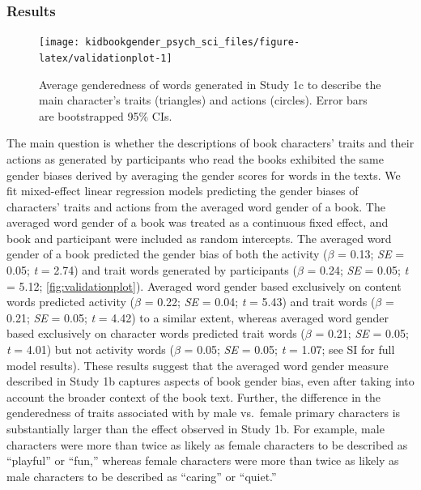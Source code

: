 \documentclass[
  english,
  ,man,floatsintext]{apa6}
\begin{document}
\hypertarget{results-1}{%
\subsubsection{Results}\label{results-1}}

\begin{figure}[t]
\texttt{[image: kidbookgender\_psych\_sci\_files/figure-latex/validationplot-1]} \caption{Average genderedness of words generated in Study 1c to describe the main character's traits (triangles) and actions (circles). Error bars are bootstrapped 95\% CIs.}\label{fig:validationplot}
\end{figure}

The main question is whether the descriptions of book characters' traits and their actions as generated by participants who read the books exhibited the same gender biases derived by averaging the gender scores for words in the texts. We fit mixed-effect linear regression models predicting the gender biases of characters' traits and actions from the averaged word gender of a book. The averaged word gender of a book was treated as a continuous fixed effect, and book and participant were included as random intercepts. The averaged word gender of a book predicted the gender bias of both the activity (\(\beta\) = 0.13; \emph{SE} = 0.05; \emph{t} = 2.74) and trait words generated by participants (\(\beta\) = 0.24; \emph{SE} = 0.05; \emph{t} = 5.12; \autoref{fig:validationplot}). Averaged word gender based exclusively on content words predicted activity (\(\beta\) = 0.22; \emph{SE} = 0.04; \emph{t} = 5.43) and trait words (\(\beta\) = 0.21; \emph{SE} = 0.05; \emph{t} = 4.42) to a similar extent, whereas averaged word gender based exclusively on character words predicted trait words (\(\beta\) = 0.21; \emph{SE} = 0.05; \emph{t} = 4.01) but not activity words (\(\beta\) = 0.05; \emph{SE} = 0.05; \emph{t} = 1.07; see SI for full model results). These results suggest that the averaged word gender measure described in Study 1b captures aspects of book gender bias, even after taking into account the broader context of the book text. Further, the difference in the genderedness of traits associated with by male vs.~female primary characters is substantially larger than the effect observed in Study 1b. For example, male characters were more than twice as likely as female characters to be described as ``playful'' or ``fun,'' whereas female characters were more than twice as likely as male characters to be described as ``caring'' or ``quiet.''
\end{document}
